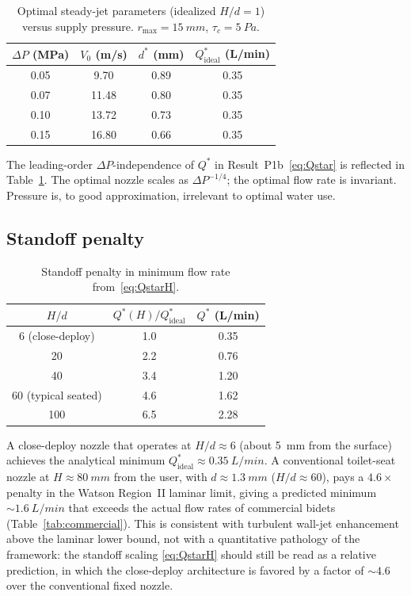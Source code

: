 \documentclass[aps,prfluids,reprint,amsmath,amssymb,floatfix]{revtex4-2}
\begin{document}
\begin{table}[h]
\centering
\caption{Optimal steady-jet parameters (idealized $H/d = 1$) versus
supply pressure. $r_\mathrm{max} = \SI{15}{mm}$, $\tau_c = \SI{5}{Pa}$.}
\label{tab:pressure}
\begin{tabular}{cccc}
\toprule
$\Delta P$ (MPa) & $V_0$ (m/s) & $d^*$ (mm) & $Q^*_\mathrm{ideal}$ (L/min) \\
\midrule
0.05 & 9.70  & 0.89 & 0.35 \\
0.07 & 11.48 & 0.80 & 0.35 \\
0.10 & 13.72 & 0.73 & 0.35 \\
0.15 & 16.80 & 0.66 & 0.35 \\
\bottomrule
\end{tabular}
\end{table}

The leading-order $\Delta P$-independence of $Q^*$ in
Result~P1b~\eqref{eq:Qstar} is reflected in Table~\ref{tab:pressure}.
The optimal nozzle scales as $\Delta P^{-1/4}$; the optimal flow rate
is invariant. Pressure is, to good approximation, irrelevant to optimal
water use.

\subsection{Standoff penalty}

\begin{table}[h]
\centering
\caption{Standoff penalty in minimum flow rate from~\eqref{eq:QstarH}.}
\label{tab:standoff}
\begin{tabular}{ccc}
\toprule
$H/d$ & $Q^*(H)/Q^*_\mathrm{ideal}$ & $Q^*$ (L/min) \\
\midrule
6 (close-deploy) & 1.0 & 0.35 \\
20 & 2.2 & 0.76 \\
40 & 3.4 & 1.20 \\
60 (typical seated) & 4.6 & 1.62 \\
100 & 6.5 & 2.28 \\
\bottomrule
\end{tabular}
\end{table}

A close-deploy nozzle that operates at $H/d \approx 6$ (about
\SI{5}{mm} from the surface) achieves the analytical minimum
$Q^*_\mathrm{ideal} \approx \SI{0.35}{L/min}$. A conventional
toilet-seat nozzle at $H \approx \SI{80}{mm}$ from the user, with
$d \approx \SI{1.3}{mm}$ ($H/d \approx 60$), pays a $4.6\times$ penalty
in the Watson Region~II laminar limit, giving a predicted minimum
$\sim\!\SI{1.6}{L/min}$ that exceeds the actual flow rates of
commercial bidets (Table~\ref{tab:commercial}). This is consistent
with turbulent wall-jet enhancement above the laminar lower bound,
not with a quantitative pathology of the framework: the standoff
scaling \eqref{eq:QstarH} should still be read as a relative
prediction, in which the close-deploy architecture is
favored by a factor of $\sim 4.6$ over the conventional fixed
nozzle.
\end{document}

